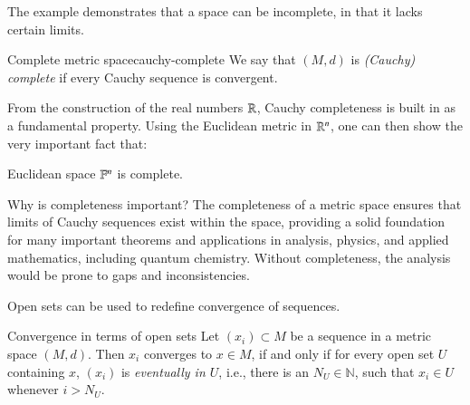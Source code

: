 The example demonstrates that a space can be incomplete, in that it lacks certain limits.



\begin{myDefinition}{Complete metric space}{cauchy-complete}
    We say that $(M,d)$ is \emph{(Cauchy) complete} if every Cauchy sequence is convergent.
\end{myDefinition}

From the construction of the real numbers $\mathbb{R}$, Cauchy completeness is built in as a fundamental property. Using the Euclidean metric in $\mathbb{R}^n$, one can then show the very important fact that:
\begin{myTheorem}{}{}
    Euclidean space $\mathbb{F}^n$ is complete.
\end{myTheorem}


Why is completeness important? The completeness of a metric space ensures that limits of Cauchy sequences exist within the space, providing a solid foundation for many important theorems and applications in analysis, physics, and applied mathematics, including quantum chemistry. Without completeness, the analysis would be prone to gaps and inconsistencies.



Open sets can be used to redefine convergence of sequences.
\begin{myTheorem}{Convergence in terms of open sets}{}
    Let $(x_i)\subset M$ be a sequence in a metric space $(M,d)$. Then $x_i$ converges to $x\in M$, if and only if for every open set $U$ containing $x$, $(x_i)$ is \emph{eventually in $U$}, i.e., there is an $N_U\in \mathbb{N}$, such that $x_i \in U$ whenever $i>N_U$. 
\end{myTheorem}



